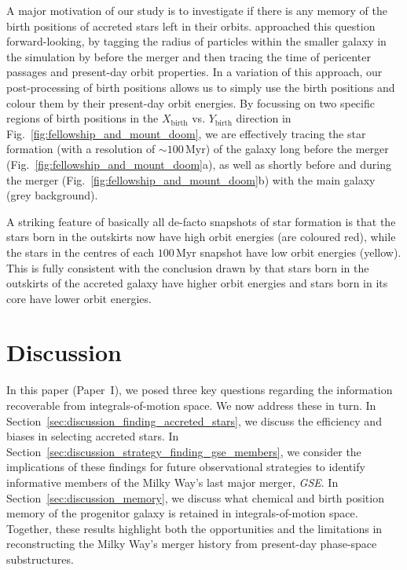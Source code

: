 \documentclass[fleqn,usenatbib]{mnras}
\begin{document}
A major motivation of our study is to investigate if there is any memory of the birth positions of accreted stars left in their orbits. \citet{Skuladottir2025} approached this question forward-looking, by tagging the radius of particles within the smaller galaxy in the simulation by \citet{Mori2024} before the merger and then tracing the time of pericenter passages and present-day orbit properties. In a variation of this approach, our post-processing of birth positions allows us to simply use the birth positions and colour them by their present-day orbit energies. By focussing on two specific regions of birth positions in the $X_\mathrm{birth}$ vs. $Y_\mathrm{birth}$ direction in Fig.~\ref{fig:fellowship_and_mount_doom}, we are effectively tracing the star formation (with a resolution of $\sim 100\,\mathrm{Myr}$) of the galaxy long before the merger (Fig.~\ref{fig:fellowship_and_mount_doom}a), as well as shortly before and during the merger (Fig.~\ref{fig:fellowship_and_mount_doom}b) with the main galaxy (grey background).

A striking feature of basically all de-facto snapshots of star formation is that the stars born in the outskirts now have high orbit energies (are coloured red), while the stars in the centres of each $100\,\mathrm{Myr}$ snapshot have low orbit energies (yellow). This is fully consistent with the conclusion drawn by \citet{Skuladottir2025} that stars born in the outskirts of the accreted galaxy have higher orbit energies and stars born in its core have lower orbit energies.

\section{Discussion}
\label{sec:discussion}

In this paper (Paper~I), we posed three key questions regarding the information recoverable from integrals-of-motion space. We now address these in turn. In Section~\ref{sec:discussion_finding_accreted_stars}, we discuss the efficiency and biases in selecting accreted stars. In Section~\ref{sec:discussion_strategy_finding_gse_members}, we consider the implications of these findings for future observational strategies to identify informative members of the Milky Way’s last major merger, \textit{GSE}. In Section~\ref{sec:discussion_memory}, we discuss what chemical and birth position memory of the progenitor galaxy is retained in integrals-of-motion space. Together, these results highlight both the opportunities and the limitations in reconstructing the Milky Way’s merger history from present-day phase-space substructures.
\end{document}

